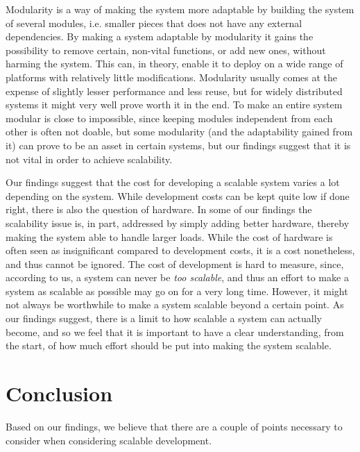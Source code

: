 \documentclass{article}
\begin{document}
Modularity is a way of making the system more adaptable by building the system
of several modules, i.e. smaller pieces that does not have any external
dependencies\cite{lipson2007principles}. By making a system adaptable by
modularity it gains the possibility to remove certain, non-vital functions, or
add new ones, without harming the system. This can, in theory, enable it to
deploy on a wide range of platforms with relatively little modifications.
Modularity usually comes at the expense of slightly lesser performance and less
reuse, but for widely distributed systems it might very well prove worth it in
the end. To make an entire system modular is close to impossible, since keeping
modules independent from each other is often not doable, but some modularity
(and the adaptability gained from it) can prove to be an asset in certain
systems, but our findings suggest that it is not vital in order to achieve
scalability.

Our findings suggest that the cost for developing a scalable system varies a
lot depending on the system. While development costs can be kept quite low if
done right, there is also the question of hardware. In some of our findings the
scalability issue is, in part, addressed by simply adding better
hardware\cite{fayad2005towards}\cite{haggander1999guidelines}, thereby making
the system able to handle larger loads. While the cost of hardware is often
seen as insignificant compared to development costs, it is a cost nonetheless,
and thus cannot be ignored.
The cost of development is hard to measure, since, according to us, a system
can never be \emph{too scalable}, and thus an effort to make a system as
scalable as possible may go on for a very long time. However, it might not
always be worthwhile to make a system scalable beyond a certain point. As our
findings suggest, there is a limit to how scalable a system can actually
become\cite{amdahl1967validity}, and so we feel that it is important to have a
clear understanding, from the start, of how much effort should be put into
making the system scalable.

\section{Conclusion}

Based on our findings, we believe that there are a couple of points necessary to
consider when considering scalable development.
\end{document}
